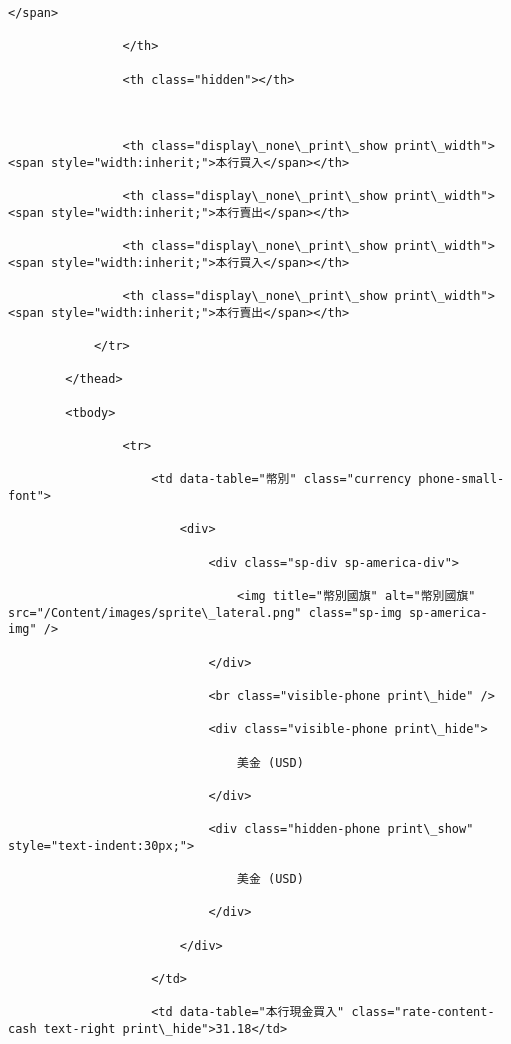 \documentclass[11pt]{article}
\begin{document}
\begin{Verbatim}[commandchars=\\\{\}]
                    </span>

                </th>

                <th class="hidden"></th>



                <th class="display\_none\_print\_show print\_width"><span style="width:inherit;">本行買入</span></th>

                <th class="display\_none\_print\_show print\_width"><span style="width:inherit;">本行賣出</span></th>

                <th class="display\_none\_print\_show print\_width"><span style="width:inherit;">本行買入</span></th>

                <th class="display\_none\_print\_show print\_width"><span style="width:inherit;">本行賣出</span></th>

            </tr>

        </thead>

        <tbody>

                <tr>

                    <td data-table="幣別" class="currency phone-small-font">

                        <div>

                            <div class="sp-div sp-america-div">

                                <img title="幣別國旗" alt="幣別國旗" src="/Content/images/sprite\_lateral.png" class="sp-img sp-america-img" />

                            </div>

                            <br class="visible-phone print\_hide" />

                            <div class="visible-phone print\_hide">

                                美金 (USD)

                            </div>

                            <div class="hidden-phone print\_show" style="text-indent:30px;">

                                美金 (USD)

                            </div>

                        </div>

                    </td>

                    <td data-table="本行現金買入" class="rate-content-cash text-right print\_hide">31.18</td>


\end{Verbatim}
\end{document}
